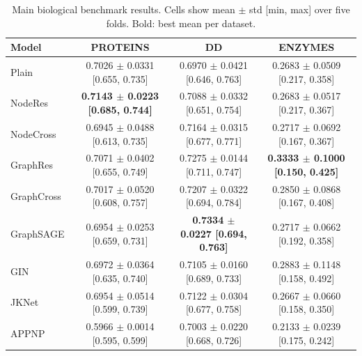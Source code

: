 \begin{table}[t]
\centering
\footnotesize
\setlength{\tabcolsep}{4pt}
\caption{Main biological benchmark results. Cells show mean $\pm$ std [min, max] over five folds. Bold: best mean per dataset.}
\label{tab:all_results_1}
\begin{tabular}{lccc}
\toprule
Model & PROTEINS & DD & ENZYMES \\
\midrule
Plain & 0.7026 $\pm$ 0.0331 [0.655, 0.735] & 0.6970 $\pm$ 0.0421 [0.646, 0.763] & 0.2683 $\pm$ 0.0509 [0.217, 0.358] \\
NodeRes & \textbf{0.7143 $\pm$ 0.0223 [0.685, 0.744]} & 0.7088 $\pm$ 0.0332 [0.651, 0.754] & 0.2683 $\pm$ 0.0517 [0.217, 0.367] \\
NodeCross & 0.6945 $\pm$ 0.0488 [0.613, 0.735] & 0.7164 $\pm$ 0.0315 [0.677, 0.771] & 0.2717 $\pm$ 0.0692 [0.167, 0.367] \\
GraphRes & 0.7071 $\pm$ 0.0402 [0.655, 0.749] & 0.7275 $\pm$ 0.0144 [0.711, 0.747] & \textbf{0.3333 $\pm$ 0.1000 [0.150, 0.425]} \\
GraphCross & 0.7017 $\pm$ 0.0520 [0.608, 0.757] & 0.7207 $\pm$ 0.0322 [0.694, 0.784] & 0.2850 $\pm$ 0.0868 [0.167, 0.408] \\
GraphSAGE & 0.6954 $\pm$ 0.0253 [0.659, 0.731] & \textbf{0.7334 $\pm$ 0.0227 [0.694, 0.763]} & 0.2717 $\pm$ 0.0662 [0.192, 0.358] \\
GIN & 0.6972 $\pm$ 0.0364 [0.635, 0.740] & 0.7105 $\pm$ 0.0160 [0.689, 0.733] & 0.2883 $\pm$ 0.1148 [0.158, 0.492] \\
JKNet & 0.6954 $\pm$ 0.0514 [0.599, 0.739] & 0.7122 $\pm$ 0.0304 [0.677, 0.758] & 0.2667 $\pm$ 0.0660 [0.158, 0.350] \\
APPNP & 0.5966 $\pm$ 0.0014 [0.595, 0.599] & 0.7003 $\pm$ 0.0220 [0.668, 0.726] & 0.2133 $\pm$ 0.0239 [0.175, 0.242] \\
\bottomrule
\end{tabular}
\end{table}

